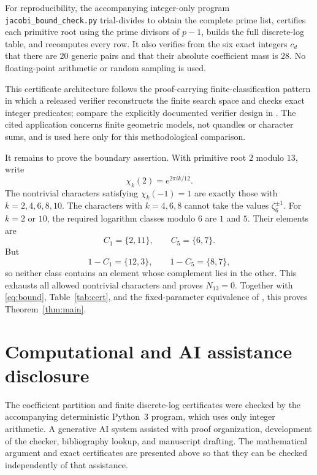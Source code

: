 \documentclass[11pt]{article}
\begin{document}
For reproducibility, the accompanying integer-only program
\texttt{jacobi\_bound\_check.py} trial-divides to obtain the complete prime
list, certifies each primitive root using the prime divisors of $p-1$, builds
the full discrete-log table, and recomputes every row.  It also verifies from
the six exact integers $c_d$ that there are $20$ generic pairs and that their
absolute coefficient mass is $28$.  No floating-point arithmetic or random
sampling is used.

This certificate architecture follows the proof-carrying finite-classification
pattern in which a released verifier reconstructs the finite search space and
checks exact integer predicates; compare the explicitly documented verifier
design in \cite{202608.1658}.  The cited application concerns finite geometric
models, not quandles or character sums, and is used here only for this
methodological comparison.

It remains to prove the boundary assertion.  With primitive root $2$ modulo
$13$, write
\[
 \chi_k(2)=e^{2\pi i k/12}.
\]
The nontrivial characters satisfying $\chi_k(-1)=1$ are exactly those with
$k=2,4,6,8,10$.  The characters with $k=4,6,8$ cannot take the values
$\zeta_6^{\pm1}$.  For $k=2$ or $10$, the required logarithm classes modulo
$6$ are $1$ and $5$.  Their elements are
\[
 C_1=\{2,11\},\qquad C_5=\{6,7\}.
\]
But
\[
 1-C_1=\{12,3\},\qquad 1-C_5=\{8,7\},
\]
so neither class contains an element whose complement lies in the other.
This exhausts all allowed nontrivial characters and proves $N_{13}=0$.
Together with \eqref{eq:bound}, Table~\ref{tab:cert}, and the
fixed-parameter equivalence of \cite{ETV2026}, this proves
Theorem~\ref{thm:main}.

\section*{Computational and AI assistance disclosure}

The coefficient partition and finite discrete-log certificates were checked
by the accompanying deterministic Python~3 program, which uses only integer
arithmetic.  A generative AI system assisted with proof organization,
development of the checker, bibliography lookup, and manuscript drafting.
The mathematical argument and exact certificates are presented above so that
they can be checked independently of that assistance.



\end{document}

